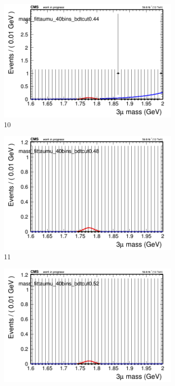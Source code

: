 \begin{figure}[h!]
\begin{subfigure}{0.2\textwidth}
        \includegraphics[width=\textwidth]{unfixed_exp/plots/taumu/massfit_taumu_40bins_bdtcut0.44.png}
        \caption{10}
    \end{subfigure}
    \begin{subfigure}{0.2\textwidth}
        \includegraphics[width=\textwidth]{unfixed_exp/plots/taumu/massfit_taumu_40bins_bdtcut0.48.png}
        \caption{11}
    \end{subfigure}
    \begin{subfigure}{0.2\textwidth}
        \includegraphics[width=\textwidth]{unfixed_exp/plots/taumu/massfit_taumu_40bins_bdtcut0.52.png}

\end{subfigure}
\end{figure}
